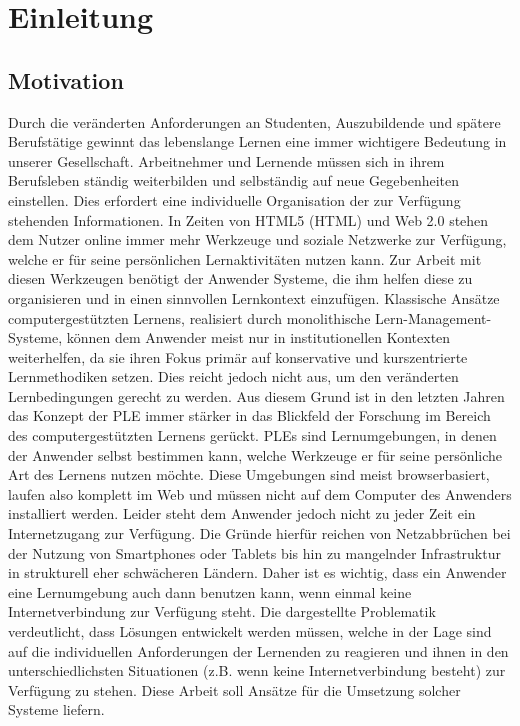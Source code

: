 \chapter{Einleitung}\label{chapter:Kapitel1}

\section{Motivation}
Durch die veränderten Anforderungen an Studenten, Auszubildende und spätere Berufstätige gewinnt das lebenslange Lernen eine immer wichtigere Bedeutung in unserer Gesellschaft. Arbeitnehmer und Lernende müssen sich in ihrem Berufsleben ständig weiterbilden und selbständig auf neue Gegebenheiten einstellen. Dies erfordert eine individuelle Organisation der zur Verfügung stehenden Informationen. In Zeiten von HTML5 (\acl{HTML})  und Web 2.0 stehen dem Nutzer online immer mehr Werkzeuge und soziale Netzwerke zur Verfügung, welche er für seine persönlichen Lernaktivitäten nutzen kann. Zur Arbeit mit diesen Werkzeugen benötigt der Anwender Systeme, die ihm helfen diese zu organisieren und in einen sinnvollen Lernkontext einzufügen. Klassische Ansätze computergestützten Lernens, realisiert durch monolithische Lern-Management-Systeme, können dem Anwender meist nur in institutionellen Kontexten weiterhelfen, da sie ihren Fokus primär auf konservative und kurszentrierte Lernmethodiken setzen. Dies reicht jedoch nicht aus, um den veränderten Lernbedingungen gerecht zu werden. Aus diesem Grund ist in den letzten Jahren das Konzept der \ac{PLE} immer stärker in das Blickfeld der Forschung im Bereich des computergestützten Lernens gerückt. \acp{PLE} sind Lernumgebungen, in denen der Anwender selbst bestimmen kann, welche Werkzeuge er für seine persönliche Art des Lernens nutzen möchte. Diese Umgebungen sind meist browserbasiert, laufen also komplett im Web und müssen nicht auf dem Computer des Anwenders installiert werden. 
Leider steht dem Anwender jedoch nicht zu jeder Zeit ein Internetzugang zur Verfügung. Die Gründe hierfür reichen von Netzabbrüchen bei der Nutzung von Smartphones oder Tablets bis hin zu mangelnder Infrastruktur in strukturell eher schwächeren Ländern. Daher ist es wichtig, dass ein Anwender eine Lernumgebung auch dann benutzen kann, wenn einmal keine Internetverbindung zur Verfügung steht. Die dargestellte Problematik verdeutlicht, dass Lösungen entwickelt werden müssen, welche in der Lage sind auf die individuellen Anforderungen der Lernenden zu reagieren und ihnen in den unterschiedlichsten Situationen (z.B. wenn keine Internetverbindung besteht) zur Verfügung zu stehen. Diese Arbeit soll Ansätze für die Umsetzung solcher Systeme liefern.

